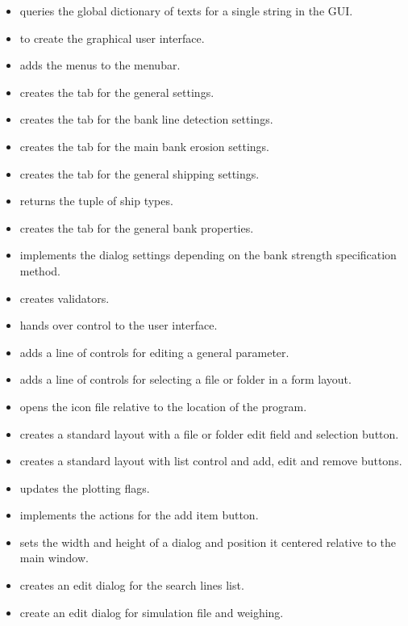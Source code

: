 \begin{itemize}
\item {} queries the global dictionary of texts for a single string in the GUI.
\item {} to create the graphical user interface.
\item {} adds the menus to the menubar.
\item {} creates the tab for the general settings.
\item {} creates the tab for the bank line detection settings.
\item {} creates the tab for the main bank erosion settings.
\item {} creates the tab for the general shipping settings.
\item {} returns the tuple of ship types.
\item {} creates the tab for the general bank properties.
\item {} implements the dialog settings depending on the bank strength specification method.
\item {} creates validators.
\item {} hands over control to the user interface.
\item {} adds a line of controls for editing a general parameter.
\item {} adds a line of controls for selecting a file or folder in a form layout.
\item {} opens the icon file relative to the location of the program.
\item {} creates a standard layout with a file or folder edit field and selection button.
\item {} creates a standard layout with list control and add, edit and remove buttons.
\item {} updates the plotting flags.
\item {} implements the actions for the add item button.
\item {} sets the width and height of a dialog and position it centered relative to the main window.
\item {} creates an edit dialog for the search lines list.
\item {} create an edit dialog for simulation file and weighing.

\end{itemize}
